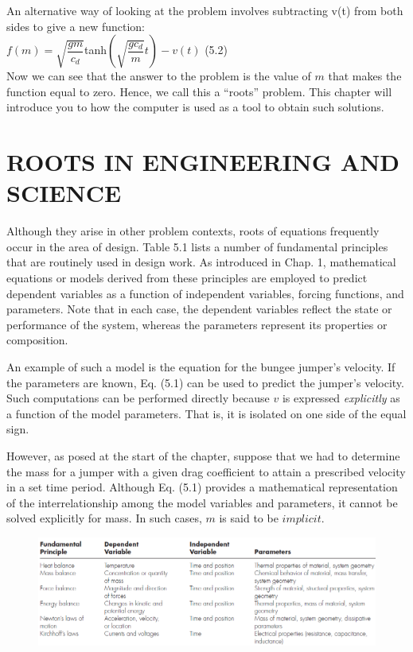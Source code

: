 \documentclass[../main.tex]{subfiles}
\begin{document}
An alternative way of looking at the problem involves subtracting v(t) from both sides
to give a new function:\\

$f(m)=\sqrt{\dfrac{gm}{c_d}}$tanh$(\sqrt{\dfrac{gc_d}{m}}t)-v(t)$
\hfill (5.2)\\

\noindent Now we can see that the answer to the problem is the value of $m$ that makes the function
equal to zero. Hence, we call this a ``roots'' problem. This chapter will introduce you to how
the computer is used as a tool to obtain such solutions.\\

\section[ROOTS IN ENGINEERING AND SCIENCE]{ROOTS IN ENGINEERING AND SCIENCE}
\noindent Although they arise in other problem contexts, roots of equations frequently occur in the
area of design. Table 5.1 lists a number of fundamental principles that are routinely used in
design work. As introduced in Chap. 1, mathematical equations or models derived from
these principles are employed to predict dependent variables as a function of independent
variables, forcing functions, and parameters. Note that in each case, the dependent variables
reflect the state or performance of the system, whereas the parameters represent its
properties or composition.

An example of such a model is the equation for the bungee jumper's velocity. If the parameters
are known, Eq. (5.1) can be used to predict the jumper's velocity. Such computations
can be performed directly because $v$ is expressed \emph{explicitly} as a function of the model
parameters. That is, it is isolated on one side of the equal sign.

However, as posed at the start of the chapter, suppose that we had to determine the
mass for a jumper with a given drag coefficient to attain a prescribed velocity in a set time
period. Although Eq. (5.1) provides a mathematical representation of the interrelationship
among the model variables and parameters, it cannot be solved explicitly for mass. In such
cases, $m$ is said to be $implicit$.\\

\begin{figure}[h]
    \includegraphics[width=0.9\linewidth]{./images/table_5_1}
\end{figure}
\end{document}
